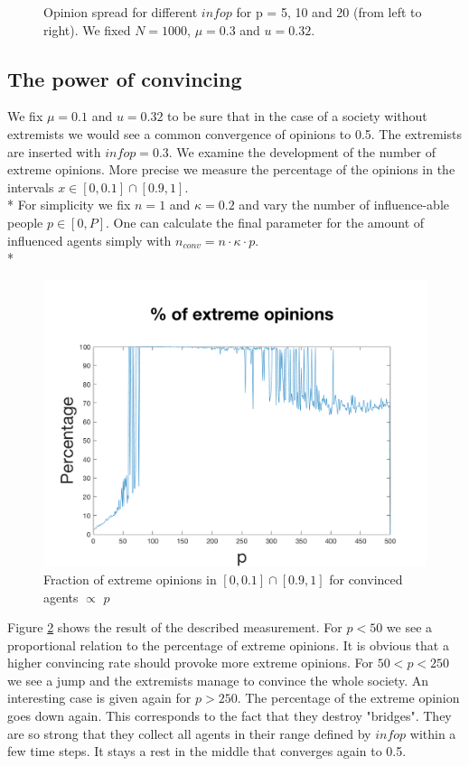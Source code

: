 \documentclass[11pt]{article}
\begin{document}
\begin{figure}[!htb]
\caption{Opinion spread for different $infop$ for p = 5, 10 and 20 (from left to right). We fixed $N = 1000$, $\mu = 0.3$ and $u = 0.32$.}
\label{fig:varinfop}
\end{figure}



\subsection{The power of convincing}
We fix $\mu = 0.1$ and $u = 0.32$ to be sure that in the case of a society without extremists we would see a common convergence of opinions to 0.5. The extremists are inserted with $infop = 0.3$. We examine the development of the number of extreme opinions. More precise we measure the percentage of the opinions in the intervals $x \in [0, 0.1] \cap [0.9, 1]$. \\*
For simplicity we fix $n = 1$ and $\kappa = 0.2$ and vary the number of influence-able people $p \in [0,P]$. One can calculate the final parameter for the amount of influenced agents simply with $n_{conv} = n\cdot\kappa\cdot p$. \\*

\begin{figure}[!htb]
\center

  \includegraphics[width=0.6\linewidth]{gen_plot_intervall_201712182172720605e+01.png}
  \caption{Fraction of extreme opinions in $[0, 0.1] \cap [0.9, 1]$ for convinced agents $\propto$ $p$}
  \label{fig:varynconv}
\end{figure}

Figure \ref{fig:varynconv} shows the result of the described measurement. For $p < 50$ we see a proportional relation to the  percentage of extreme opinions. It is obvious that a higher convincing rate should provoke more extreme opinions. For $50 < p < 250$ we see a jump and the extremists manage to convince the whole society. An interesting case is given again for $p > 250$. The percentage of the extreme opinion goes down again. This corresponds to the fact that they destroy "bridges". They are so strong that they collect all agents in their range defined by $infop$ within a few time steps. It stays a rest in the middle that converges again to 0.5.
\end{document}
